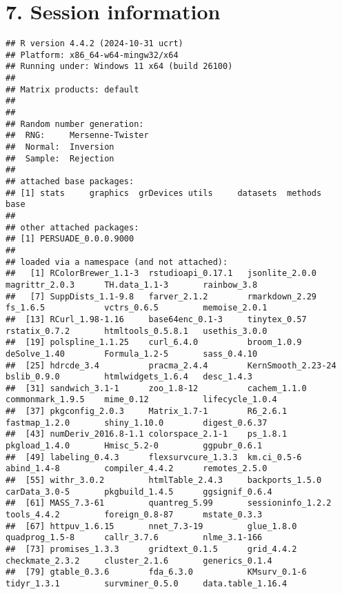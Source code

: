 \documentclass[
]{article}
\begin{document}
\clearpage

\section{7. Session information}\label{session-information}

\begin{verbatim}
## R version 4.4.2 (2024-10-31 ucrt)
## Platform: x86_64-w64-mingw32/x64
## Running under: Windows 11 x64 (build 26100)
## 
## Matrix products: default
## 
## 
## Random number generation:
##  RNG:     Mersenne-Twister 
##  Normal:  Inversion 
##  Sample:  Rejection 
##  
## attached base packages:
## [1] stats     graphics  grDevices utils     datasets  methods   base     
## 
## other attached packages:
## [1] PERSUADE_0.0.0.9000
## 
## loaded via a namespace (and not attached):
##   [1] RColorBrewer_1.1-3  rstudioapi_0.17.1   jsonlite_2.0.0      magrittr_2.0.3      TH.data_1.1-3       rainbow_3.8        
##   [7] SuppDists_1.1-9.8   farver_2.1.2        rmarkdown_2.29      fs_1.6.5            vctrs_0.6.5         memoise_2.0.1      
##  [13] RCurl_1.98-1.16     base64enc_0.1-3     tinytex_0.57        rstatix_0.7.2       htmltools_0.5.8.1   usethis_3.0.0      
##  [19] polspline_1.1.25    curl_6.4.0          broom_1.0.9         deSolve_1.40        Formula_1.2-5       sass_0.4.10        
##  [25] hdrcde_3.4          pracma_2.4.4        KernSmooth_2.23-24  bslib_0.9.0         htmlwidgets_1.6.4   desc_1.4.3         
##  [31] sandwich_3.1-1      zoo_1.8-12          cachem_1.1.0        commonmark_1.9.5    mime_0.12           lifecycle_1.0.4    
##  [37] pkgconfig_2.0.3     Matrix_1.7-1        R6_2.6.1            fastmap_1.2.0       shiny_1.10.0        digest_0.6.37      
##  [43] numDeriv_2016.8-1.1 colorspace_2.1-1    ps_1.8.1            pkgload_1.4.0       Hmisc_5.2-0         ggpubr_0.6.1       
##  [49] labeling_0.4.3      flexsurvcure_1.3.3  km.ci_0.5-6         abind_1.4-8         compiler_4.4.2      remotes_2.5.0      
##  [55] withr_3.0.2         htmlTable_2.4.3     backports_1.5.0     carData_3.0-5       pkgbuild_1.4.5      ggsignif_0.6.4     
##  [61] MASS_7.3-61         quantreg_5.99       sessioninfo_1.2.2   tools_4.4.2         foreign_0.8-87      mstate_0.3.3       
##  [67] httpuv_1.6.15       nnet_7.3-19         glue_1.8.0          quadprog_1.5-8      callr_3.7.6         nlme_3.1-166       
##  [73] promises_1.3.3      gridtext_0.1.5      grid_4.4.2          checkmate_2.3.2     cluster_2.1.6       generics_0.1.4     
##  [79] gtable_0.3.6        fda_6.3.0           KMsurv_0.1-6        tidyr_1.3.1         survminer_0.5.0     data.table_1.16.4  

\end{verbatim}
\end{document}
